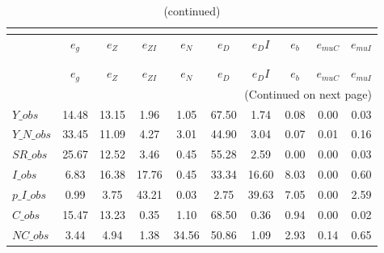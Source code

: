  
\begin{center}
\begin{longtable}{lccccccccc} 
\caption{VARIANCE DECOMPOSITION (in percent)}\\
 \label{Table:th_var_decomp_uncond}\\
\toprule 
$               $	 & 	 $        {e_g}$	 & 	 $        {e_Z}$	 & 	 $     {e_{ZI}}$	 & 	 $        {e_N}$	 & 	 $        {e_D}$	 & 	 $       {e_DI}$	 & 	 $        {e_b}$	 & 	 $    {e_{muC}}$	 & 	 $    {e_{muI}}$\\
\midrule \endfirsthead 
\caption{(continued)}\\
 \toprule \\ 
$               $	 & 	 $        {e_g}$	 & 	 $        {e_Z}$	 & 	 $     {e_{ZI}}$	 & 	 $        {e_N}$	 & 	 $        {e_D}$	 & 	 $       {e_DI}$	 & 	 $        {e_b}$	 & 	 $    {e_{muC}}$	 & 	 $    {e_{muI}}$\\
\midrule \endhead 
\midrule \multicolumn{10}{r}{(Continued on next page)} \\ \bottomrule \endfoot 
\bottomrule \endlastfoot 
$Y\_obs         $	 & 	        14.48	 & 	        13.15	 & 	         1.96	 & 	         1.05	 & 	        67.50	 & 	         1.74	 & 	         0.08	 & 	         0.00	 & 	         0.03 \\ 
$Y\_N\_obs      $	 & 	        33.45	 & 	        11.09	 & 	         4.27	 & 	         3.01	 & 	        44.90	 & 	         3.04	 & 	         0.07	 & 	         0.01	 & 	         0.16 \\ 
$SR\_obs        $	 & 	        25.67	 & 	        12.52	 & 	         3.46	 & 	         0.45	 & 	        55.28	 & 	         2.59	 & 	         0.00	 & 	         0.00	 & 	         0.03 \\ 
$I\_obs         $	 & 	         6.83	 & 	        16.38	 & 	        17.76	 & 	         0.45	 & 	        33.34	 & 	        16.60	 & 	         8.03	 & 	         0.00	 & 	         0.60 \\ 
$p\_I\_obs      $	 & 	         0.99	 & 	         3.75	 & 	        43.21	 & 	         0.03	 & 	         2.75	 & 	        39.63	 & 	         7.05	 & 	         0.00	 & 	         2.59 \\ 
$C\_obs         $	 & 	        15.47	 & 	        13.23	 & 	         0.35	 & 	         1.10	 & 	        68.50	 & 	         0.36	 & 	         0.94	 & 	         0.00	 & 	         0.02 \\ 
$NC\_obs        $	 & 	         3.44	 & 	         4.94	 & 	         1.38	 & 	        34.56	 & 	        50.86	 & 	         1.09	 & 	         2.93	 & 	         0.14	 & 	         0.65 \\ 

\end{longtable}
\end{center}

